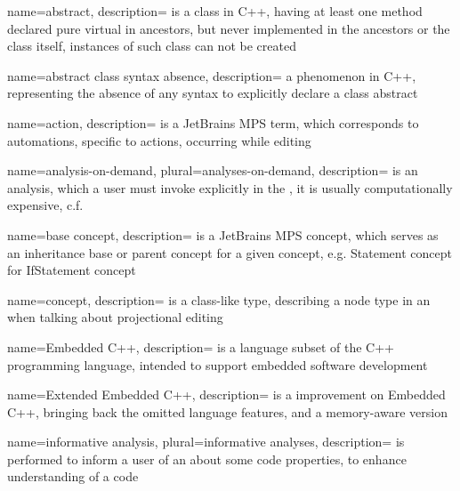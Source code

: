 {
  name=abstract,
  description={ is a class in C++, having at least one method declared pure virtual in ancestors, but never implemented in the ancestors or the
  class itself, instances of such class can not be created}
}

{
  name=abstract class syntax absence,
  description={ a phenomenon in C++, representing the absence of any syntax to explicitly declare a class abstract}
}

{
  name=action,
  description={ is a JetBrains MPS term, which corresponds to automations, specific to actions, occurring while editing}
}




{
  name=analysis-on-demand,
  plural=analyses-on-demand,
  description={ is an analysis, which a user must invoke explicitly in the , it is usually computationally expensive, c.f. 
   }
}




{
  name=base concept,
  description={ is a JetBrains MPS concept, which serves as an inheritance base or parent concept for a given concept, e.g. 
  Statement concept for IfStatement concept}
}


{
  name=concept,
  description={ is a class-like type, describing a node type in an  when talking about projectional editing}
}




{
  name=Embedded C++,
  description={ is a language subset of the C++ programming language, intended to
  support embedded software development}
}

{
  name=Extended Embedded C++,
  description={ is a improvement on Embedded C++, bringing back the omitted language features, and a memory-aware  version}
}

{
  name=informative analysis,
  plural=informative analyses,
  description={ is performed to inform a user of an  about some code properties, to enhance understanding of a code}
}



